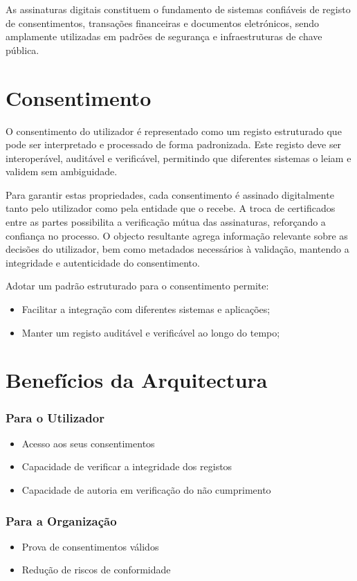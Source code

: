 As assinaturas digitais constituem o fundamento de sistemas confiáveis de registo de consentimentos, transações financeiras e documentos eletrónicos, sendo amplamente utilizadas em padrões de segurança e infraestruturas de chave pública.

\section{Consentimento}

O consentimento do utilizador é representado como um registo estruturado que pode ser interpretado e processado de forma padronizada. Este registo deve ser interoperável, auditável e verificável, permitindo que diferentes sistemas o leiam e validem sem ambiguidade.

Para garantir estas propriedades, cada consentimento é assinado digitalmente tanto pelo utilizador como pela entidade que o recebe. A troca de certificados entre as partes possibilita a verificação mútua das assinaturas, reforçando a confiança no processo. O objecto resultante agrega informação relevante sobre as decisões do utilizador, bem como metadados necessários à validação, mantendo a integridade e autenticidade do consentimento.

Adotar um padrão estruturado para o consentimento permite:
\begin{itemize}
    \item Facilitar a integração com diferentes sistemas e aplicações;
    \item Manter um registo auditável e verificável ao longo do tempo;
\end{itemize}

\section{Benefícios da Arquitectura}

\subsubsection{Para o Utilizador}
\begin{itemize}
    \item Acesso aos seus consentimentos
    \item Capacidade de verificar a integridade dos registos
    \item Capacidade de autoria em verificação do não cumprimento
\end{itemize}

\subsubsection{Para a Organização}
\begin{itemize}
    \item Prova de consentimentos válidos
    \item Redução de riscos de conformidade
\end{itemize}
